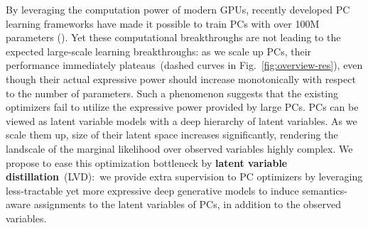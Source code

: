 \documentclass{article} %
\newcommand{\guy}[1]{\textcolor{blue}{\textbf{[Guy: #1]}}}
\begin{document}
By leveraging the computation power of modern GPUs, recently developed PC learning frameworks \citep{peharz2020einsum,molina2019spflow,dang2021juice} have made it possible to train PCs with over 100M parameters (\eg \citet{correia2022continuous}). Yet these computational breakthroughs are not leading to the expected large-scale learning breakthroughs: as we scale up PCs, their performance immediately plateaus~(dashed curves in Fig.~\ref{fig:overview-res}), even though their actual expressive power should increase monotonically with respect to the number of parameters. Such a phenomenon suggests that the existing optimizers fail to utilize the expressive power provided by large PCs. PCs can be viewed as latent variable models with a deep hierarchy of latent variables. As we scale them up, size of their latent space increases significantly, rendering the landscale of the marginal likelihood over observed variables highly complex.
We propose to ease this optimization bottleneck by \textbf{latent variable distillation}~(LVD):~we provide extra supervision to PC optimizers by leveraging less-tractable yet more expressive deep generative models to induce semantics-aware assignments to the latent variables of PCs, in addition to the observed variables. 
\end{document}
